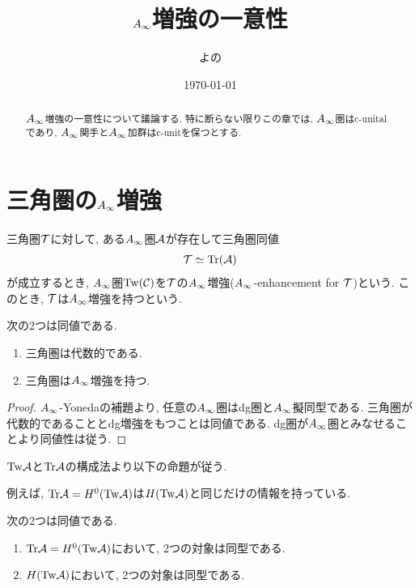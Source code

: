 \documentclass[uplatex, a4paper, 14Q, dvipdfmx]{jsarticle}
\title{\texorpdfstring{$\Ainf$}{Ainf}増強の一意性}
\author{よの}
\date{\today}
\begin{document}
\maketitle

\begin{abstract}
  $\Ainf$増強の一意性について議論する.  
  特に断らない限りこの章では, $\Ainf$圏はc-unitalであり, $\Ainf$関手と$\Ainf$加群はc-unitを保つとする. 
\end{abstract}

\tableofcontents

\section{三角圏の\texorpdfstring{$\Ainf$}{Ainf}増強}

\begin{definition}[$\Ainf$増強]
  三角圏$\mathcal{T}$に対して, ある$\Ainf$圏$\mathcal{A}$が存在して三角圏同値
  \begin{align*}
    \mathcal{T} \simeq \mathrm{Tr}(\mathcal{A})
  \end{align*}
  が成立するとき, $\Ainf$圏$\mathrm{Tw}(\mathcal{C})$を$\mathcal{T}$の$\Ainf$増強($\Ainf$-enhancement for $\mathcal{T}$)という.
  このとき, $\mathcal{T}$は$\Ainf$増強を持つという. 
\end{definition}

\begin{lemma}
  次の2つは同値である.
  \begin{enumerate}
    \item 三角圏は代数的である.
    \item 三角圏は$\Ainf$増強を持つ.
  \end{enumerate}
\end{lemma}

\begin{proof}
  $\Ainf$-Yonedaの補題より, 任意の$\Ainf$圏はdg圏と$\Ainf$擬同型である.
  三角圏が代数的であることとdg増強をもつことは同値である.
  dg圏が$\Ainf$圏とみなせることより同値性は従う.
\end{proof}

$\mathrm{Tw}\mathcal{A}$と$\mathrm{Tr}\mathcal{A}$の構成法より以下の命題が従う. 

例えば, $\mathrm{Tr}\mathcal{A} = H^0(\mathrm{Tw}\mathcal{A})$は$H(\mathrm{Tw}\mathcal{A})$と同じだけの情報を持っている. 

\begin{lemma}
  次の2つは同値である.
  \begin{enumerate}
    \item $\mathrm{Tr}\mathcal{A} = H^0(\mathrm{Tw}\mathcal{A})$において, 2つの対象は同型である.
    \item $H(\mathrm{Tw}\mathcal{A})$において, 2つの対象は同型である. 
  \end{enumerate}
\end{lemma}
\end{document}
